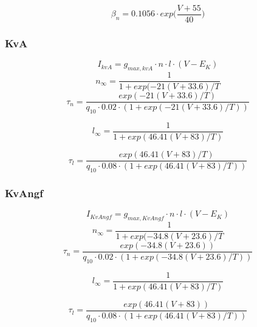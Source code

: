 \documentclass[12pt]{article}
\begin{document}
\begin{equation}
\beta_n = 0.1056 \cdot exp \Big( \frac{V + 55}{40} \Big)
\end{equation}

\subsubsection{KvA}
\begin{equation}
I_{kvA} = g_{max, kvA} \cdot n \cdot l \cdot (V - E_K)
\end{equation}
\begin{equation}
n_{\infty} = \frac{1}{1 + exp(-21(V + 33.6)/T}
\end{equation}
\begin{equation}
\tau_n = \frac{exp(-21(V + 33.6)/T) }
{q_{10} \cdot 0.02 \cdot (1 + exp(-21(V + 33.6)/T))}
\end{equation}

\begin{equation}
l_{\infty} = \frac{1}{1 + exp(46.41(V + 83)/T)}
\end{equation}

\begin{equation}
\tau_l = \frac{exp(46.41(V + 83)/T) }
{q_{10} \cdot 0.08 \cdot (1 + exp(46.41(V + 83)/T))}
\end{equation}

\subsubsection{KvAngf}
\begin{equation}
I_{KvAngf} = g_{max, KvAngf} \cdot n \cdot l \cdot (V - E_K)
\end{equation}
\begin{equation}
n_{\infty} = \frac{1}{1 + exp(-34.8(V + 23.6)/T}
\end{equation}
\begin{equation}
\tau_n = \frac{exp(-34.8(V + 23.6)) }
{q_{10} \cdot 0.02 \cdot (1 + exp(-34.8(V + 23.6)/T))}
\end{equation}

\begin{equation}
l_{\infty} = \frac{1}{1 + exp(46.41(V + 83)/T)}
\end{equation}

\begin{equation}
\tau_l = \frac{exp(46.41(V + 83)) }
{q_{10} \cdot 0.08 \cdot (1 + exp(46.41(V + 83)/T))}
\end{equation}
\end{document}
